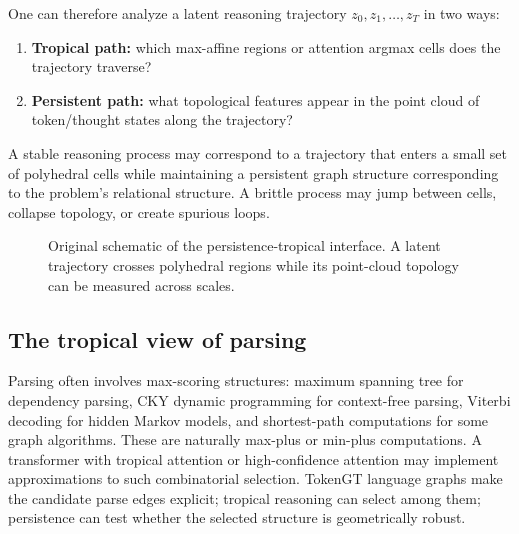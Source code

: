 \documentclass[11pt]{article}
\newcommand{\1}{\mathbf{1}}
\begin{document}
One can therefore analyze a latent reasoning trajectory $z_0,z_1,\ldots,z_T$ in two ways:
\begin{enumerate}
\item \textbf{Tropical path:} which max-affine regions or attention argmax cells does the trajectory traverse?
\item \textbf{Persistent path:} what topological features appear in the point cloud of token/thought states along the trajectory?
\end{enumerate}
A stable reasoning process may correspond to a trajectory that enters a small set of polyhedral cells while maintaining a persistent graph structure corresponding to the problem's relational structure. A brittle process may jump between cells, collapse topology, or create spurious loops.

\begin{figure}[H]
\centering
{}
\caption{Original schematic of the persistence-tropical interface. A latent trajectory crosses polyhedral regions while its point-cloud topology can be measured across scales.}
\label{fig:tropical_persistence}
\end{figure}

\subsection{The tropical view of parsing}

Parsing often involves max-scoring structures: maximum spanning tree for dependency parsing, CKY dynamic programming for context-free parsing, Viterbi decoding for hidden Markov models, and shortest-path computations for some graph algorithms. These are naturally max-plus or min-plus computations. A transformer with tropical attention or high-confidence attention may implement approximations to such combinatorial selection. TokenGT language graphs make the candidate parse edges explicit; tropical reasoning can select among them; persistence can test whether the selected structure is geometrically robust.
\end{document}
